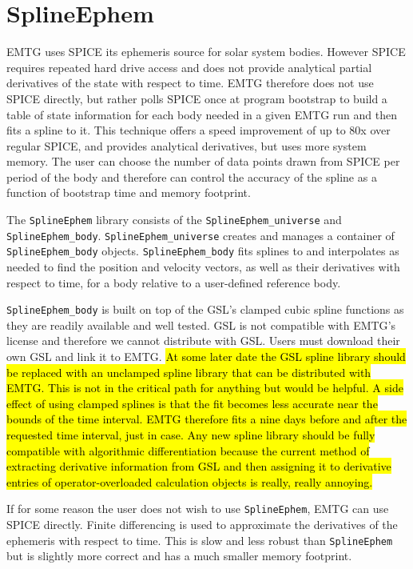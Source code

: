 \chapter{SplineEphem}
\label{chap:splineephem}

\ac{EMTG} uses \ac{SPICE} \cite{SPICE} its ephemeris source for solar system bodies. However \ac{SPICE} requires repeated hard drive access and does not provide analytical partial derivatives of the state with respect to time. \ac{EMTG} therefore does not use \ac{SPICE} directly, but rather polls \ac{SPICE} once at program bootstrap to build a table of state information for each body needed in a given \ac{EMTG} run and then fits a spline to it. This technique offers a speed improvement of up to 80x over regular \ac{SPICE}, and provides analytical derivatives, but uses more system memory. The user can choose the number of data points drawn from \ac{SPICE} per period of the body and therefore can control the accuracy of the spline as a function of bootstrap time and memory footprint.

The \texttt{SplineEphem} library consists of the \texttt{SplineEphem\_universe} and \texttt{SplineEphem\_body}. \texttt{SplineEphem\_universe} creates and manages a container of \texttt{SplineEphem\_body} objects. \texttt{SplineEphem\_body} fits splines to and interpolates as needed to find the position and velocity vectors, as well as their derivatives with respect to time, for a body relative to a user-defined reference body.

\texttt{SplineEphem\_body} is built on top of the \ac{GSL}'s clamped cubic spline functions as they are readily available and well tested. \ac{GSL} is not compatible with \ac{EMTG}'s license and therefore we cannot distribute with \ac{GSL}. Users must download their own \ac{GSL} and link it to \ac{EMTG}. \hl{At some later date the GSL spline library should be replaced with an unclamped spline library that can be distributed with EMTG. This is not in the critical path for anything but would be helpful. A side effect of using clamped splines is that the fit becomes less accurate near the bounds of the time interval. EMTG therefore fits a nine days before and after the requested time interval, just in case. Any new spline library should be fully compatible with algorithmic differentiation because the current method of extracting derivative information from GSL and then assigning it to derivative entries of operator-overloaded calculation objects is really, really annoying.}

If for some reason the user does not wish to use \texttt{SplineEphem}, \ac{EMTG} can use \ac{SPICE} directly. Finite differencing is used to approximate the derivatives of the ephemeris with respect to time. This is slow and less robust than \texttt{SplineEphem} but is slightly more correct and has a much smaller memory footprint.